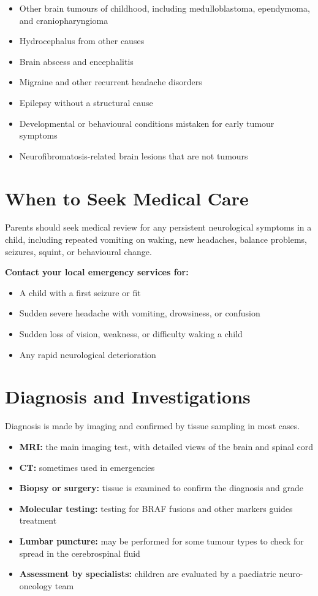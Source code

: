 \begin{itemize}
    \item Other brain tumours of childhood, including medulloblastoma, ependymoma, and craniopharyngioma
    \item Hydrocephalus from other causes
    \item Brain abscess and encephalitis
    \item Migraine and other recurrent headache disorders
    \item Epilepsy without a structural cause
    \item Developmental or behavioural conditions mistaken for early tumour symptoms
    \item Neurofibromatosis-related brain lesions that are not tumours
\end{itemize}

\section*{When to Seek Medical Care}
Parents should seek medical review for any persistent neurological symptoms in a child, including repeated vomiting on waking, new headaches, balance problems, seizures, squint, or behavioural change.

\textbf{Contact your local emergency services for:}
\begin{itemize}
    \item A child with a first seizure or fit
    \item Sudden severe headache with vomiting, drowsiness, or confusion
    \item Sudden loss of vision, weakness, or difficulty waking a child
    \item Any rapid neurological deterioration
\end{itemize}

\section*{Diagnosis and Investigations}
Diagnosis is made by imaging and confirmed by tissue sampling in most cases.

\begin{itemize}
    \item \textbf{MRI:} the main imaging test, with detailed views of the brain and spinal cord
    \item \textbf{CT:} sometimes used in emergencies
    \item \textbf{Biopsy or surgery:} tissue is examined to confirm the diagnosis and grade
    \item \textbf{Molecular testing:} testing for BRAF fusions and other markers guides treatment
    \item \textbf{Lumbar puncture:} may be performed for some tumour types to check for spread in the cerebrospinal fluid
    \item \textbf{Assessment by specialists:} children are evaluated by a paediatric neuro-oncology team
\end{itemize}

